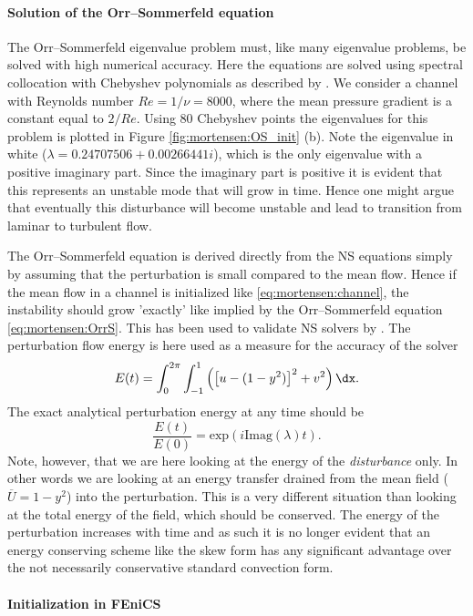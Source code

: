 \paragraph{Solution of the Orr--Sommerfeld equation}

The Orr--Sommerfeld eigenvalue problem must, like many eigenvalue
problems, be solved with high numerical accuracy. Here the equations
are solved using spectral collocation with Chebyshev polynomials as
described by \citet{Trefethen2006}. We consider a channel
with Reynolds number $Re=1/\nu=8000$, where the mean pressure gradient
is a constant equal to $2/Re$. Using 80 Chebyshev points the
eigenvalues for this problem is plotted in Figure
\ref{fig:mortensen:OS_init} (b). Note the eigenvalue in white
($\lambda = 0.24707506+0.00266441 i$), which is the only eigenvalue
with a positive imaginary part. Since the imaginary part is positive
it is evident that this represents an unstable mode that will grow in
time. Hence one might argue that eventually this disturbance will
become unstable and lead to transition from laminar to turbulent flow.

The Orr--Sommerfeld equation is derived directly from the NS equations
simply by assuming that the perturbation is small compared to the mean
flow. Hence if the mean flow in a channel is initialized like
\eqref{eq:mortensen:channel}, the instability should grow
'exactly' like implied by the Orr--Sommerfeld equation
\eqref{eq:mortensen:OrrS}. This has been used to validate NS solvers
by \citet{MalikZangHussaini1984}. The perturbation
flow energy is here used as a measure for the accuracy of the solver
\begin{equation}
  E(t)= \int_0^{2\pi}\int_{-1}^{1} \left( \left[u-(1-y^2)\right]^2 + v^2
	  \right) \dx.
\end{equation}
The exact analytical perturbation energy at any time should be
\[ \frac{E(t)}{E(0)}=\text{exp}(i \text{Imag}(\lambda) t).\]
Note, however, that we are here looking at the energy of the
\textit{disturbance} only. In other words we are looking at an energy
transfer drained from the mean field ($\overline{U}=1-y^2$) into the
perturbation. This is a very different situation than looking at the
total energy of the field, which should be conserved. The energy of
the perturbation increases with time and as such it is no longer
evident that an energy conserving scheme like the skew form has any
significant advantage over the not necessarily conservative standard
convection form.

\paragraph{Initialization in FEniCS}

